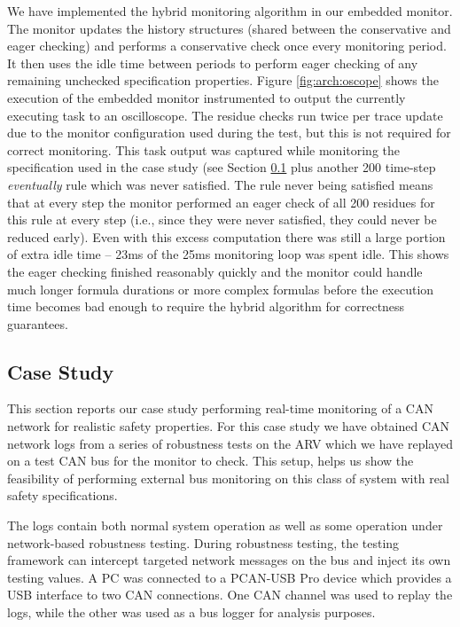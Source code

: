 We have implemented the hybrid monitoring algorithm in our embedded monitor. The monitor updates the history structures (shared between the conservative and eager checking) and performs a conservative check once every monitoring period. It then uses the idle time between periods to perform eager checking of any remaining unchecked specification properties.
%
Figure \ref{fig:arch:oscope} shows the execution of the embedded monitor instrumented to output the currently executing task to an oscilloscope. The residue checks run twice per trace update due to the monitor configuration used during the test, but this is not required for correct monitoring.
This task output was captured while monitoring the specification used in the case study (see Section \ref{sec:case_study} plus another 200 time-step \emph{eventually} rule which was never satisfied. 
The rule never being satisfied means that at every step the monitor performed an eager check of all 200 residues for this rule at every step (i.e., since they were never satisfied, they could never be reduced early). 
Even with this excess computation there was still a large portion of extra idle time -- 23ms of the 25ms monitoring loop was spent idle. 
This shows the eager checking finished reasonably quickly and the monitor could handle much longer formula durations or more complex formulas before the execution time becomes bad enough to require the hybrid algorithm for correctness guarantees. 

\subsection{Case Study}
\label{sec:case_study}
This section reports our case study performing real-time monitoring of a CAN network for realistic safety properties. 
For this case study we have obtained CAN network logs from a series of robustness tests on the ARV which we have replayed on a test CAN bus for the monitor to check. 
This setup, %
helps us show the feasibility of performing external bus monitoring on this class of system with real safety specifications.


The logs contain both normal system operation as well as some operation under network-based robustness testing. During robustness testing, the testing framework can intercept targeted network messages on the bus and inject its own testing values. %
A PC was connected to a PCAN-USB Pro \cite{PCAN-USBPro} device which provides a USB interface to two CAN connections. One CAN channel was used to replay the logs, while the other was used as a bus logger for analysis purposes.

